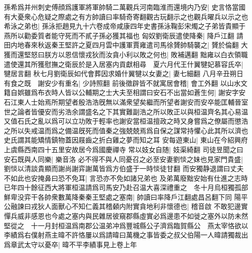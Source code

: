 孫希爲并州刺史傅顔爲護軍將軍帥騎二萬觀兵河南臨淮而還境内乃安|{
	史言恪當國有大憂衆心危疑之際處之有方帥讀曰率騎奇寄翻觀古玩翻示之也觀兵曜兵以示之也}
希泳之弟也|{
	孫泳拒趙見九十六卷成帝咸康四年史書孫泳鞠彭宋燭之子弟皆貴顯于燕所以勸委質者能守死而不貳子孫必獲其福也}
匈奴劉衛辰遣使降秦|{
	降戶江翻}
請田内地春來秋返秦王堅許之夏四月雲中護軍賈雍遣司馬徐贇帥騎襲之|{
	贇於倫翻}
大獲而還堅怒曰朕方以恩信懷戎狄而汝貪小利以敗之何也|{
	敗補邁翻}
黜雍以白衣領職遣使還其所獲慰撫之衛辰於是入居塞内貢獻相尋　夏六月代王什翼犍妃慕容氏卒|{
	犍居言翻}
秋七月劉衛辰如代會葬因求婚什翼犍以女妻之|{
	妻七細翻}
八月辛丑朔日有食之既　謝安少有重名|{
	少詩照翻}
前後徵辟皆不就寓居會稽|{
	會工外翻}
以山水文籍自娯雖爲布衣時人皆以公輔期之士大夫至相謂曰安石不出當如蒼生何|{
	謝安字安石江東人士始焉所期望者殷浩浩旣無以滿衆望矣繼而所望者謝安而安卒能匡輔晉室世之論者皆優安而劣浩余謂盛名之下其實難副浩之所以敗正以與桓温齊名其心易温又值石氏之亂以爲可以立功敗于輕率也謝安當桓温擅政之時又身嘗爲之僚屬而懲浩之所以失戒温而爲之備温旣死而值秦之強兢兢焉爲自保之謀常持懼心此其所以濟也史氏謂其能矯情鎮物蓋因屐齒之折白雞之夢而知之耳}
安每遊東山|{
	東山在今紹興府上虞縣西南四十五里安故居今爲國慶禪寺}
常以妓女自随|{
	妓渠綺翻}
司徒昱聞之曰安石既與人同樂|{
	樂音洛}
必不得不與人同憂召之必至安妻劉惔之妹也見家門貴盛|{
	劉惔以清談貴顯而謝尚謝弈謝萬皆爲方伯盛于一時惔徒甘翻}
而安獨静退謂曰丈夫不如此也安掩鼻曰恐不免耳|{
	言恐亦不免如諸兄弟也}
及弟萬廢黜安始有仕進之志時已年四十餘征西大將軍桓温請爲司馬安乃赴召温大喜深禮重之　冬十月烏桓獨孤部鮮卑没弈干各帥衆數萬降秦秦王堅處之塞南|{
	帥讀曰率降戶江翻處昌呂翻下同}
陽平公融諫曰戎狄人面獸心不知仁義其稽顙内附實貪地利非懷德也|{
	稽音啟}
不敢犯邊實憚兵威非感恩也今處之塞内與民雜居彼窺郡縣虛實必爲邊患不如徙之塞外以防未然堅從之　十一月封桓温爲南郡公温弟冲爲豐城縣公子濟爲臨賀縣公　燕太宰恪欲以李績爲右僕射燕主暐不許恪屢以爲請暐曰萬機之事皆委之叔父伯陽一人暐請獨裁出爲章武太守以憂卒|{
	暐不平李績事見上卷上年}


